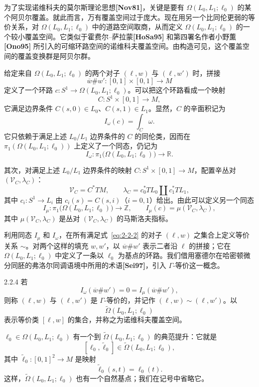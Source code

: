 为了实现诺维科夫的莫尔斯理论思想\textbf{[Nov81]}，关键是要有 $\Omega(L_0,L_1;\ell_0)$ 的某个阿贝尔覆盖。就此而言，万有覆盖空间过于庞大。现在用另一个比同伦更弱的等价关系，对 $\Omega(L_0,L_1;\ell_0)$ 中的道路空间取商，从而定义 $\Omega(L_0,L_1;\ell_0)$ 的一个较小覆盖空间。它类似于霍费尔--萨拉蒙\textbf{[HoSa95]} 和第四署名作者小野薫\textbf{[Ono95]} 所引入的可缩环路空间的诺维科夫覆盖空间。由构造可见，这个覆盖空间的覆盖变换群是阿贝尔群。

给定来自 $\Omega(L_0,L_1;\ell_0)$ 的两个对子 $(\ell,w)$ 与 $(\ell,w')$ 时，拼接
\[
  \overline w\#w':[0,1]\times[0,1]\longrightarrow M
\]
定义了一个环路 $c:S^1\to\Omega(L_0,L_1;\ell_0)$。可以把这个环路看成一个映射
\[
  C:S^1\times[0,1]\longrightarrow M,
\]
它满足边界条件
$C(s,0)\in L_0$、$C(s,1)\in L_1$。显然，$C$ 的辛面积记为
\begin{equation}
  I_\omega(c)=\int_C\omega.
  \tag{2.2.3}\label{eq:2-2-3}
\end{equation}
它只依赖于满足上述 $L_0/L_1$ 边界条件的 $C$ 的同伦类，因而在
$\pi_1(\Omega(L_0,L_1;\ell_0))$ 上定义了一个同态，仍记为
\[
  I_\omega:\pi_1\bigl(\Omega(L_0,L_1;\ell_0)\bigr)
  \longrightarrow\mathbb R.
\]

其次，对满足上述 $L_0/L_1$ 边界条件的映射
$C:S^1\times[0,1]\to M$，配置辛丛对 $(\mathcal V_C,\lambda_C)$：
\[
  \mathcal V_C=C^*TM,
  \qquad
  \lambda_C=c_0^*TL_0\amalg c_1^*TL_1,
\]
其中 $c_i:S^1\to L_i$ 由
$c_i(s)=C(s,i)$（$i=0,1$）给出。由此可以定义另一个同态
\[
  I_\mu:\pi_1\bigl(\Omega(L_0,L_1;\ell_0)\bigr)
  \longrightarrow\mathbb Z,
  \qquad
  I_\mu(c)=\mu(\mathcal V_C,\lambda_C),
\]
其中 $\mu(\mathcal V_C,\lambda_C)$ 是丛对 $(\mathcal V_C,\lambda_C)$ 的马斯洛夫指标。

利用同态 $I_\mu$ 和 $I_\omega$，在所有满足式~\eqref{eq:2-2-2} 的对子 $(\ell,w)$ 之集合上定义等价关系 $\sim$。对两个这样的填充 $w,w'$，以 $\overline w\#w'$ 表示二者沿 $\ell$ 的拼接；它在 $\Omega(L_0,L_1;\ell_0)$ 中定义了一条以 $\ell_0$ 为基点的环路。我们借用塞德尔在哈密顿微分同胚的弗洛尔同调语境中所用的术语\textbf{[Sei97]}，引入 $\Gamma$-等价这一概念。

\begin{definition}{2.2.4}\label{def:2-2-4}
若
\[
  I_\omega(\overline w\#w')=0
  =I_\mu(\overline w\#w'),
\]
则称 $(\ell,w)$ 与 $(\ell,w')$ 是 $\Gamma$-等价的，并记作
$(\ell,w)\sim(\ell,w')$。以
\[
  \widetilde\Omega(L_0,L_1;\ell_0)
\]
表示等价类 $[\ell,w]$ 的集合，并称之为诺维科夫覆盖空间。
\end{definition}

$\ell_0\in\Omega(L_0,L_1;\ell_0)$ 有一个到
$\widetilde\Omega(L_0,L_1;\ell_0)$ 的典范提升：它就是
\[
  [\ell_0,\widetilde\ell_0]
  \in\widetilde\Omega(L_0,L_1;\ell_0),
\]
其中 $\widetilde\ell_0:[0,1]^2\to M$ 是映射
\[
  \widetilde\ell_0(s,t)=\ell_0(t).
\]
这样，$\widetilde\Omega(L_0,L_1;\ell_0)$ 也有一个自然基点；我们在记号中省略它。

